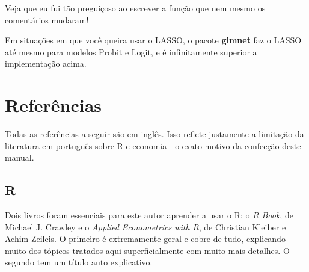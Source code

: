 \documentclass[]{book}
\newenvironment{Shaded}{\begin{snugshade}}{\end{snugshade}}
\newcommand{\KeywordTok}[1]{\textcolor[rgb]{0.13,0.29,0.53}{\textbf{#1}}}
\newcommand{\DataTypeTok}[1]{\textcolor[rgb]{0.13,0.29,0.53}{#1}}
\newcommand{\DecValTok}[1]{\textcolor[rgb]{0.00,0.00,0.81}{#1}}
\newcommand{\FloatTok}[1]{\textcolor[rgb]{0.00,0.00,0.81}{#1}}
\newcommand{\StringTok}[1]{\textcolor[rgb]{0.31,0.60,0.02}{#1}}
\newcommand{\CommentTok}[1]{\textcolor[rgb]{0.56,0.35,0.01}{\textit{#1}}}
\newcommand{\ControlFlowTok}[1]{\textcolor[rgb]{0.13,0.29,0.53}{\textbf{#1}}}
\newcommand{\OperatorTok}[1]{\textcolor[rgb]{0.81,0.36,0.00}{\textbf{#1}}}
\newcommand{\NormalTok}[1]{#1}
\begin{document}
\begin{Shaded}
\end{Shaded}

Veja que eu fui tão preguiçoso ao escrever a função que nem mesmo os
comentários mudaram!

Em situações em que você queira usar o LASSO, o pacote \textbf{glmnet}
faz o LASSO até mesmo para modelos Probit e Logit, e é infinitamente
superior a implementação acima.

\chapter{Referências}\label{referencias}

Todas as referências a seguir são em inglês. Isso reflete justamente a
limitação da literatura em português sobre R e economia - o exato motivo
da confecção deste manual.

\section{R}\label{r}

Dois livros foram essenciais para este autor aprender a usar o R: o
\emph{R Book}, de Michael J. Crawley e o \emph{Applied Econometrics with
R}, de Christian Kleiber e Achim Zeileis. O primeiro é extremamente
geral e cobre de tudo, explicando muito dos tópicos tratados aqui
superficialmente com muito mais detalhes. O segundo tem um título auto
explicativo.
\end{document}

